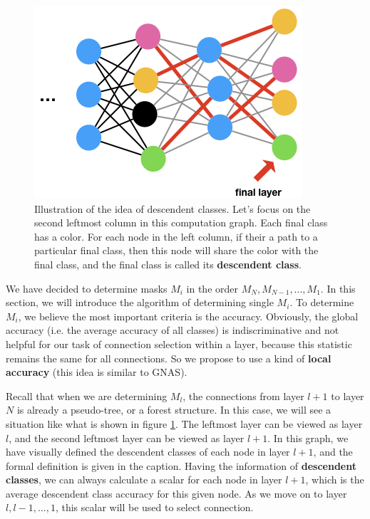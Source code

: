 \documentclass{acmtog} %
\begin{document}
\begin{figure}
\centering
\includegraphics[width=0.5\linewidth]{assets/decendent.png}
\caption{Illustration of the idea of descendent classes. Let's focus on the second leftmost column in this computation graph. Each final class has a color. For each node in the left column, if their a path to a particular final class, then this node will share the color with the final class, and the final class is called its \textbf{descendent class}.}
\label{fig:descendent}
\end{figure}

We have decided to determine masks $M_i$ in the order $M_N, M_{N-1}, ..., M_1$. In this section, we will introduce the algorithm of determining single $M_i$. To determine $M_i$, we believe the most important criteria is the accuracy. Obviously, the global accuracy (i.e. the average accuracy of all classes) is indiscriminative and not helpful for our task of connection selection within a layer, because this statistic remains the same for all connections. So we propose to use a kind of \textbf{local accuracy} (this idea is similar to GNAS\cite{GNAS}).

Recall that when we are determining $M_l$, the connections from layer $l+1$ to layer $N$ is already a pseudo-tree, or a forest structure. In this case, we will see a situation like what is shown in figure \ref{fig:descendent}. The leftmost layer can be viewed as layer $l$, and the second leftmost layer can be viewed as layer $l+1$. In this graph, we have visually defined the descendent classes of each node in layer $l+1$, and the formal definition is given in the caption. Having the information of \textbf{descendent classes}, we can always calculate a scalar for each node in layer $l+1$, which is the average descendent class accuracy for this given node. As we move on to layer $l, l-1, ..., 1$, this scalar will be used to select connection.
\end{document}
